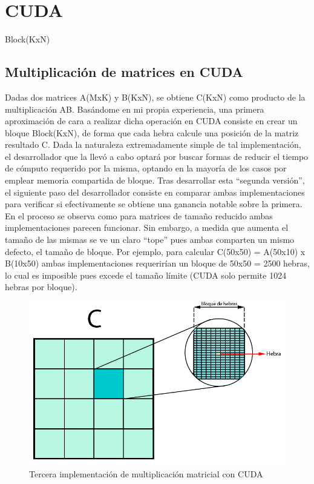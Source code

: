 \section{CUDA}

Block(KxN)
\subsection{Multiplicación de matrices en CUDA}

Dadas dos matrices A(MxK) y B(KxN), se obtiene C(KxN) como producto de la multiplicación AB. Basándome en mi propia experiencia, una primera aproximación de cara a realizar dicha operación en CUDA consiste en crear un bloque Block(KxN), de forma que cada hebra calcule una posición de la matriz resultado C. Dada la naturaleza extremadamente simple de tal implementación, el desarrollador que la llevó a cabo optará por buscar formas de reducir el tiempo de cómputo requerido por la misma, optando en la mayoría de los casos por emplear memoria compartida de bloque. Tras desarrollar esta ``segunda versión'', el siguiente paso del desarrollador consiste en comparar ambas implementaciones para verificar si efectivamente se obtiene una ganancia notable sobre la primera. En el proceso se observa como para matrices de tamaño reducido ambas implementaciones parecen funcionar. Sin embargo, a medida que aumenta el tamaño de las mismas se ve un claro ``tope'' pues ambas comparten un mismo defecto, el tamaño de bloque. Por ejemplo, para calcular C(50x50) = A(50x10) x B(10x50) ambas implementaciones requerirían un bloque de 50x50 = 2500 hebras, lo cual es imposible pues excede el tamaño límite (CUDA solo permite 1024 hebras por bloque). \\

\begin{figure}[H]
	\centering
	\includegraphics[scale=0.3]{imagenes/gemm_tile_v3.jpg}  
	\caption{Tercera implementación de multiplicación matricial con CUDA}
	\label{fig:mult_matrix_cuda_v3}
\end{figure}

